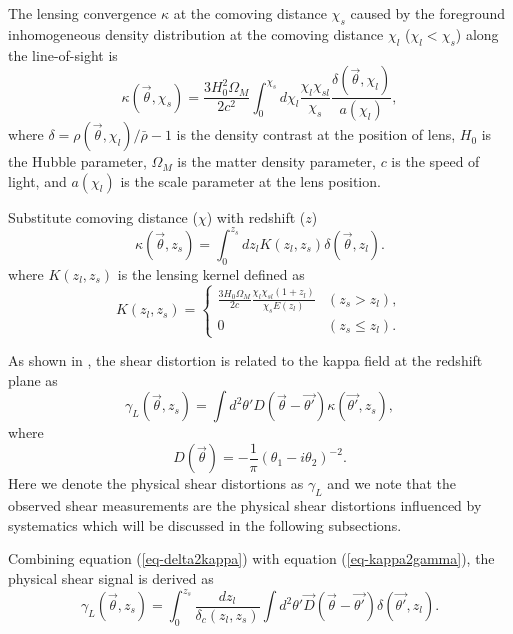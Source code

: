 \documentclass[twocolumn]{aastex62}
\begin{document}
The lensing convergence $\kappa$ at the comoving distance $\chi_s$ caused by the foreground inhomogeneous
density distribution at the comoving distance $\chi_l$ ($\chi_l< \chi_s$) along the line-of-sight is
\citep{LSS-massMap-Glimpse3D-Leonard2014}
\begin{equation}
\kappa(\vec{\theta},\chi_s)=\frac{3H_0^2\Omega_M}{2 c^2} \int_0^{\chi_s} d\chi_l \frac{\chi_l \chi_{sl}}{\chi_s}
\frac{\delta(\vec{\theta},\chi_l)}{a(\chi_l)},
\end{equation}
where $\delta=\rho(\vec{\theta},\chi_l)/\bar{\rho}-1$ is the density contrast
at the position of lens, $H_0$ is the Hubble parameter, $\Omega_M$ is the matter density parameter, $c$ is the speed
of light, and $a(\chi_l)$ is the scale parameter at the lens position.

Substitute comoving distance ($\chi$) with redshift ($z$)
\begin{equation}\label{eq-delta2kappa}
\kappa(\vec{\theta},z_s)=\int_0^{z_s} dz_l K(z_l,z_s)\delta(\vec{\theta},z_l).
\end{equation}
where $K(z_l,z_s)$ is the lensing kernel defined as
\begin{equation}
K(z_l,z_s) =
\begin{cases}
\frac{3H_0\Omega_M}{2 c} \frac{\chi_l \chi_{sl} (1+z_l)}{\chi_{s} E\left(z_l\right)} & (z_s>z_l),\\
0&(z_s \leq z_l).
\end{cases}
\end{equation}

As shown in \citet{massMap-KS1993}, the shear distortion is related to the kappa field at the redshift plane as
\begin{equation}\label{eq-kappa2gamma}
\gamma_L(\vec{\theta},z_s) = \int  d^2 \theta' D(\vec{\theta}-\vec{\theta'}) \kappa(\vec{\theta'},z_s),
\end{equation}
where
\begin{equation}
D(\vec{\theta})=-\frac{1}{\pi}(\theta_1-i\theta_2)^{-2}.
\end{equation}
Here we denote the physical shear distortions as $\gamma_L$ and we note that the observed shear measurements are the
physical shear distortions influenced by systematics which will be discussed in the following subsections.

Combining equation (\ref{eq-delta2kappa}) with equation (\ref{eq-kappa2gamma}), the physical shear signal is derived as
\begin{equation}\label{eq-delta2gammat}
\gamma_L(\vec{\theta},z_s) = \int_0^{z_s} \frac{dz_l}{\delta_{c}(z_l,z_s)} \int d^2 \theta' \vec{D}(\vec{\theta}-\vec{\theta'}) \delta(\vec{\theta'},z_l).
\end{equation}
\end{document}
